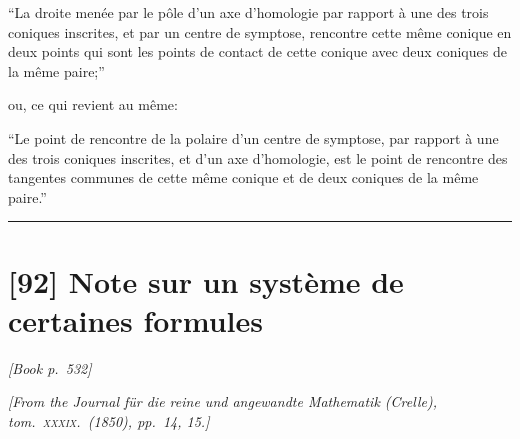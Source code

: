 \documentclass[11pt]{article}
\begin{document}
``La droite men\'ee par le p\^ole d'un axe d'homologie par rapport \`a une des trois coniques inscrites, et par un centre de symptose, rencontre cette m\^eme conique en deux points qui sont les points de contact de cette conique avec deux coniques de la m\^eme paire;''

ou, ce qui revient au m\^eme:

``Le point de rencontre de la polaire d'un centre de symptose, par rapport \`a une des trois coniques inscrites, et d'un axe d'homologie, est le point de rencontre des tangentes communes de cette m\^eme conique et de deux coniques de la m\^eme paire.''

\bigskip
\hrule
\bigskip


\section*{[92] Note sur un syst\`eme de certaines formules}

\noindent\textit{[Book p.~532]}\hfill

\smallskip

\noindent\emph{[From the Journal f\"ur die reine und angewandte Mathematik (Crelle), tom.~\textsc{xxxix}.\ (1850), pp.~14, 15.]}

\medskip
\end{document}
